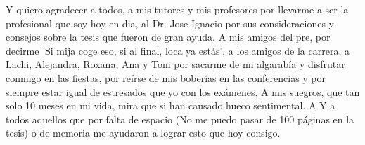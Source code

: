 \begin{acknowledgements}
    Y quiero agradecer a todos, a mis tutores y mis profesores por llevarme a ser la profesional que soy hoy en dia, al Dr. Jose Ignacio por sus consideraciones y consejos sobre la tesis que fueron de gran ayuda. A mis amigos del pre, por decirme 'Si mija coge eso, si al final, loca ya estás', a los amigos de la carrera, a Lachi, Alejandra, Roxana, Ana y Toni por sacarme de mi algarabía y disfrutar conmigo en las fiestas, por reírse de mis boberías en las conferencias y por siempre estar igual de estresados que yo con los exámenes. A mis suegros, que tan solo 10 meses en mi vida, mira que si han causado hueco sentimental. A Y a todos aquellos que por falta de espacio (No me puedo pasar de 100 páginas en la tesis) o de memoria me ayudaron a lograr esto que hoy consigo.


\end{acknowledgements}